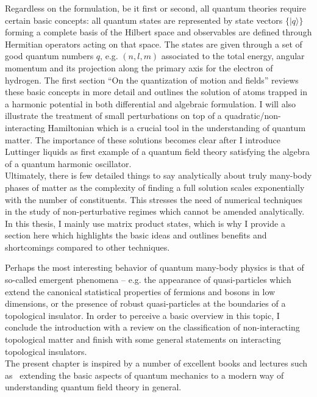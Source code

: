 Regardless on the formulation, be it first or second, all quantum theories require certain basic concepts:
all quantum states are represented by state vectors $\{|q\rangle\}$ forming a complete basis of the Hilbert space and observables are defined through Hermitian operators acting on that space.
The states are given through a set of good quantum numbers $q$, e.g. $(n,l,m)$ associated to the total energy, angular momentum and its projection along the primary axis for the electron of hydrogen.
The first section ``On the quantization of motion and fields'' reviews these basic concepts in more detail and outlines the solution of atoms trapped in a harmonic potential in both differential and algebraic formulation.
I will also illustrate the treatment of small perturbations on top of a quadratic/non-interacting Hamiltonian which is a crucial tool in the understanding of quantum matter.
The importance of these solutions becomes clear after I introduce Luttinger liquids as first example of a quantum field theory satisfying the algebra of a quantum harmonic oscillator.
\\

Ultimately, there is few detailed things to say analytically about truly many-body phases of matter as the complexity of finding a full solution scales exponentially with the number of constituents.
This stresses the need of numerical techniques in the study of non-perturbative regimes which cannot be amended analytically.
In this thesis, I mainly use matrix product states, which is why I provide a section here which highlights the basic ideas and outlines benefits and shortcomings compared to other techniques.

Perhaps the most interesting behavior of quantum many-body physics is that of so-called emergent phenomena -- e.g. the appearance of quasi-particles which extend the canonical statistical properties of fermions and bosons in low dimensions, or the presence of robust quasi-particles at the boundaries of a topological insulator.
In order to perceive a basic overview in this topic, I conclude the introduction with a review on the classification of non-interacting topological matter and finish with some general statements on interacting topological insulators.
\\

The present chapter is inspired by a number of excellent books and lectures such as~\cite{AltlandSimons2010,BruusFlensberg2004,FetterWalecka2003} extending the basic aspects of quantum mechanics to a modern way of understanding quantum field theory in general.

